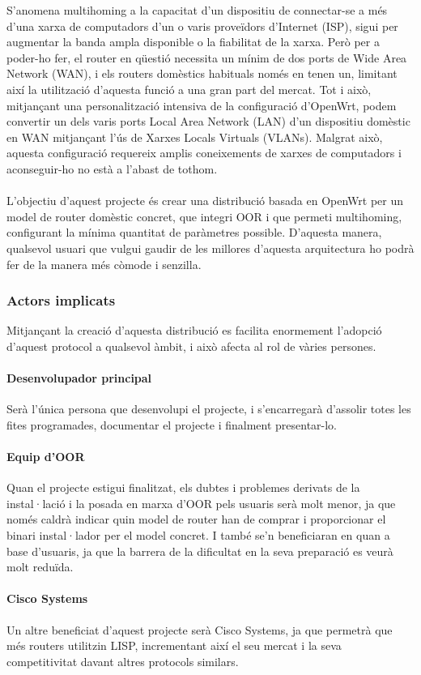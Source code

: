 \documentclass[11pt]{article}
\begin{document}
S’anomena multihoming a la capacitat d’un dispositiu de connectar-se a més d’una xarxa de computadors d’un o varis proveïdors d’Internet (ISP), sigui per augmentar la banda ampla disponible o la fiabilitat de la xarxa. Però per a poder-ho fer, el router en qüestió necessita un mínim de dos ports de Wide Area Network (WAN), i els routers domèstics habituals només en tenen un, limitant així la utilització d’aquesta funció a una gran part del mercat. Tot i això, mitjançant una personalització intensiva de la configuració d’OpenWrt, podem convertir un dels varis ports Local Area Network (LAN) d’un dispositiu domèstic en WAN mitjançant l’ús de Xarxes Locals Virtuals (VLANs). Malgrat això, aquesta configuració requereix amplis coneixements de xarxes de computadors i aconseguir-ho no està a l’abast de tothom.\\
\\
L’objectiu d’aquest projecte és crear una distribució basada en OpenWrt per un model de router domèstic concret, que integri OOR i que permeti multihoming, configurant la mínima quantitat de paràmetres possible. D’aquesta manera, qualsevol usuari que vulgui gaudir de les millores d’aquesta arquitectura ho podrà fer de la manera més còmode i senzilla.

\subsubsection{Actors implicats}
Mitjançant la creació d’aquesta distribució es facilita enormement l’adopció d’aquest protocol a qualsevol àmbit, i això afecta al rol de vàries persones.
\paragraph{Desenvolupador principal}
Serà l'única persona que desenvolupi el projecte, i s’encarregarà d’assolir totes les fites programades, documentar el projecte i finalment presentar-lo.
\paragraph{Equip d’OOR}
Quan el projecte estigui finalitzat, els dubtes i problemes derivats de la instal·lació i la posada en marxa d’OOR pels usuaris serà molt menor, ja que només caldrà indicar quin model de router han de comprar i proporcionar el binari instal·lador per el model concret. I també se’n beneficiaran en quan a base d’usuaris,  ja que la barrera de la dificultat en la seva preparació es veurà molt reduïda.
\paragraph{Cisco Systems}
Un altre beneficiat d’aquest projecte serà Cisco Systems, ja que permetrà que més routers utilitzin LISP, incrementant així el seu mercat i la seva competitivitat davant altres protocols similars.
\end{document}
